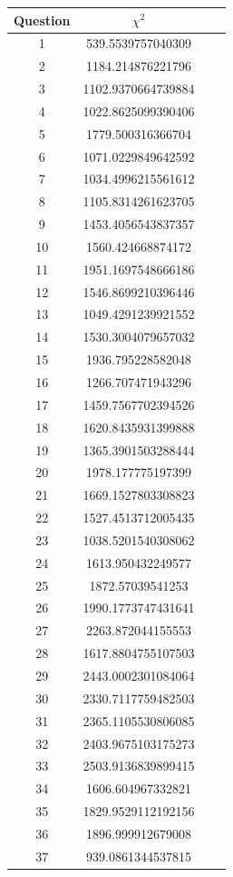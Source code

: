 \documentclass[10pt]{article}
\begin{document}
\begin{longtable}
{|c|c|c|c|}
	\hline
Question & ${\chi}^2$\\
	\hline
1 & 539.5539757040309 \\
2 & 1184.214876221796 \\
3 & 1102.9370664739884 \\
4 & 1022.8625099390406 \\
5 & 1779.500316366704 \\
6 & 1071.0229849642592 \\
7 & 1034.4996215561612 \\
8 & 1105.8314261623705 \\
9 & 1453.4056543837357 \\
10 & 1560.424668874172 \\
11 & 1951.1697548666186 \\
12 & 1546.8699210396446 \\
13 & 1049.4291239921552 \\
14 & 1530.3004079657032 \\
15 & 1936.795228582048 \\
16 & 1266.707471943296 \\
17 & 1459.7567702394526 \\
18 & 1620.8435931399888 \\
19 & 1365.3901503288444 \\
20 & 1978.177775197399 \\
21 & 1669.1527803308823 \\
22 & 1527.4513712005435 \\
23 & 1038.5201540308062 \\
24 & 1613.950432249577 \\
25 & 1872.57039541253 \\
26 & 1990.1773747431641 \\
27 & 2263.872044155553 \\
28 & 1617.8804755107503 \\
29 & 2443.0002301084064 \\
30 & 2330.7117759482503 \\
31 & 2365.1105530806085 \\
32 & 2403.9675103175273 \\
33 & 2503.9136839899415 \\
34 & 1606.604967332821 \\
35 & 1829.9529112192156 \\
36 & 1896.999912679008 \\
37 & 939.0861344537815 \\

\end{longtable}
\end{document}
